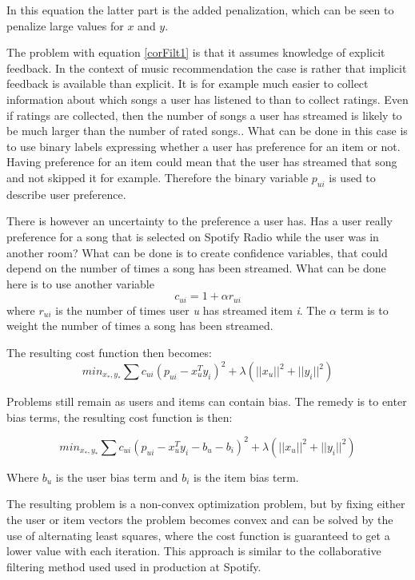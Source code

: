 \documentclass[a4paper,11pt]{kth-mag}
\begin{document}
In this equation the latter part is the added penalization, which can be seen to penalize large values for $x$ and $y$.

The problem with equation \ref{corFilt1} is that it assumes knowledge of explicit feedback. In the context of music recommendation the case is rather that implicit feedback is available than explicit. It is for example much easier to collect information about which songs a user has listened to than to collect ratings. Even if ratings are collected, then the number of songs a user has streamed is likely to be much larger than the number of rated songs.. What can be done in this case is to use binary labels expressing whether a user has preference for an item or not. Having preference for an item could mean that the user has streamed that song and not skipped it for example. Therefore the binary variable $p_{ui}$ is used to describe user preference.

There is however an uncertainty to the preference a user has. Has a user really preference for a song that is selected on Spotify Radio while the user was in another room? What can be done is to create confidence variables, that could depend on the number of times a song has been streamed. What can be done here is to use another variable \[ c_{ui} = 1 + \alpha r_{ui} \] where $r_{ui}$ is the number of times user \textit{u} has streamed item \textit{i}. The $\alpha$ term is to weight the number of times a song has been streamed.

The resulting cost function then becomes:
\begin{equation}
min_{x_*,y_*} \sum c_{ui}(p_{ui} - x_u^Ty_i)^2 +  \lambda(||x_u||^2 + ||y_i||^2)
\end{equation}

Problems still remain as users and items can contain bias. The remedy is to enter bias terms, the resulting cost function is then:

\begin{equation}
min_{x_*,y_*} \sum c_{ui}(p_{ui} - x_u^Ty_i - b_u - b_i)^2 +  \lambda(||x_u||^2 + ||y_i||^2)
\end{equation}

Where $b_u$ is the user bias term and $b_i$ is the item bias term.

The resulting problem is a non-convex optimization problem, but by fixing either the user or item vectors the problem becomes convex and can be solved by the use of alternating least squares, where the cost function is guaranteed to get a lower value with each iteration\cite{hu2008collaborative}. This approach is similar to the collaborative filtering method used used in production at Spotify.
\end{document}
